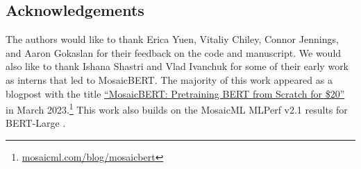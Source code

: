 \documentclass{article}
\newcommand{\beginsupplement}{%
        \setcounter{table}{0}
        \renewcommand{\thetable}{S\arabic{table}}%
        \setcounter{figure}{0}
        \renewcommand{\thefigure}{S\arabic{figure}}%
        \renewcommand{\theHfigure}{Supplement.\thefigure}
     }
\begin{document}
\subsection*{Acknowledgements}
The authors would like to thank Erica Yuen, Vitaliy Chiley, Connor Jennings, and Aaron Gokaslan for their feedback on the code and manuscript. We would also like to thank Ishana Shastri and Vlad Ivanchuk for some of their early work as interns that led to MosaicBERT. The majority of this work appeared as a blogpost with the title \href{https://www.mosaicml.com/blog/mosaicbert}{``MosaicBERT: Pretraining BERT from Scratch for \$20''} in March 2023.\footnote{\href{https://www.mosaicml.com/blog/mosaicbert}{\url{mosaicml.com/blog/mosaicbert}}} This work also builds on the MosaicML MLPerf v2.1 results for BERT-Large \citep{mosaicml2022mlperf}.










\newpage





\newpage

\appendix
\beginsupplement


\end{document}
